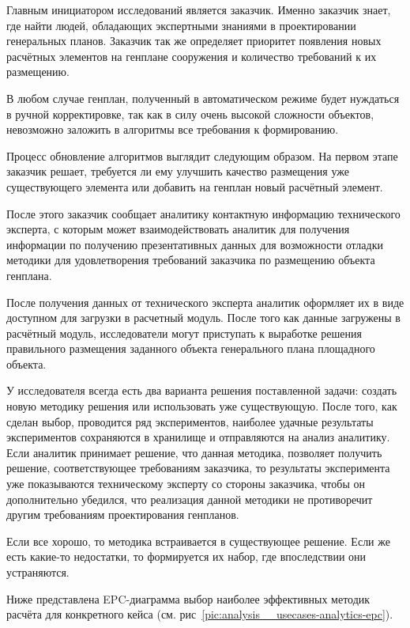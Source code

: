 Главным инициатором исследований является заказчик. Именно заказчик знает, где найти людей,
обладающих экспертными знаниями в проектировании генеральных планов.
Заказчик так же определяет приоритет появления
новых расчётных элементов на генплане сооружения и количество требований к их размещению.

В любом случае генплан, полученный в автоматическом режиме будет нуждаться в ручной корректировке,
так как в силу очень высокой сложности объектов, невозможно заложить в алгоритмы все требования к формированию.

Процесс обновление алгоритмов выглядит следующим образом.
На первом этапе заказчик решает, требуется ли ему улучшить качество размещения уже существующего элемента
или добавить на генплан новый расчётный элемент.

После этого заказчик сообщает аналитику контактную информацию технического эксперта, с которым может взаимодействовать
аналитик для получения информации по получению презентативных данных для возможности отладки методики
для удовлетворения требований заказчика по размещению объекта генплана.

После получения данных от технического эксперта аналитик оформляет их в виде доступном для загрузки в расчетный модуль.
После того как данные загружены в расчётный модуль, исследователи могут приступать к выработке решения
правильного размещения заданного объекта генерального плана площадного объекта.

У исследователя всегда есть два варианта решения поставленной задачи: создать новую методику решения
или использовать уже существующую.
После того, как сделан выбор, проводится ряд экспериментов,
наиболее удачные результаты экспериментов сохраняются в хранилище и отправляются на анализ аналитику.
Если аналитик принимает решение, что данная методика, позволяет получить решение, соответствующее требованиям
заказчика, то результаты эксперимента уже показываются техническому эксперту со стороны заказчика,
чтобы он дополнительно убедился, что реализация данной методики не противоречит другим требованиям
проектирования генпланов.

Если все хорошо, то методика встраивается в существующее решение. Если же есть какие-то недостатки, то формируется
их набор, где впоследствии они устраняются.

Ниже представлена EPC-диаграмма выбор наиболее эффективных методик расчёта для конкретного кейса
(см. рис\ \ref{pic:analysis__usecases-analytics-epc}).

